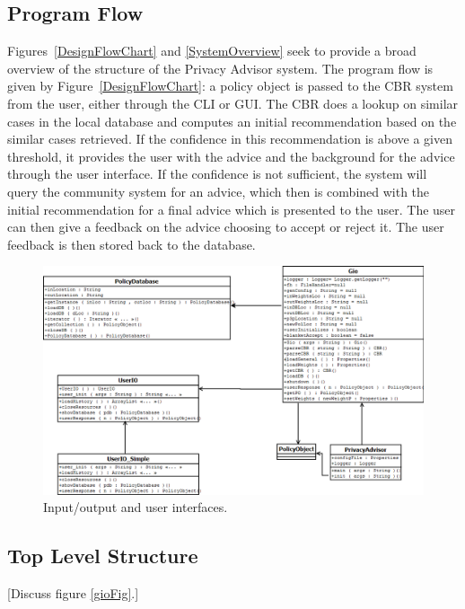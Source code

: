 \subsection{Program Flow}
Figures~\ref{DesignFlowChart} and \ref{SystemOverview} seek to provide a broad overview of the structure of the Privacy Advisor system. The program flow is given by Figure~\ref{DesignFlowChart}: a policy object is passed to the CBR system from the user, either through the CLI or GUI. The CBR does a lookup on similar cases in the local database and computes an initial recommendation based on the similar cases retrieved. If the confidence in this recommendation is above a given threshold, it provides the user with the advice and the background for the advice through the user interface. If the confidence is not sufficient, the system will query the community system for an advice, which then is combined with the initial recommendation for a final advice which is presented to the user. The user can then give a feedback on the advice choosing to accept or reject it. The user feedback is then stored back to the database.



\begin{figure}[htbp]
\begin{center}
\includegraphics[width = \textwidth]{DesignReport/uml/gio.png}
\caption{Input/output and user interfaces.}
\label{UserIO}
\end{center}
\end{figure}


\subsection{Top Level Structure}
[Discuss figure \ref{gioFig}.]

